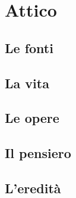 \chapter{Attico}

\section{Le fonti}

\section{La vita}

\section{Le opere}

\section{Il pensiero}

\section{L'eredità}
